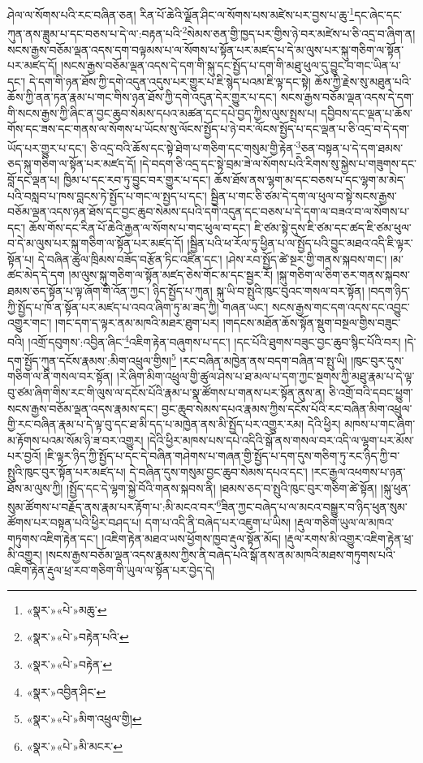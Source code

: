 ཤེལ་ལ་སོགས་པའི་རང་བཞིན་ཅན། རིན་པོ་ཆེའི་ལྗོན་ཤིང་ལ་སོགས་པས་མཛེས་པར་བྱས་པ་ཆུ་\footnote{«སྣར་»«པེ་»མཆུ་}དང་ཞེང་དང་ཀུན་ནས་ཟླུམ་པ་དང་བཅས་པ་དེ་ལ་:བརྟན་པའི་\footnote{«སྣར་»«པེ་»བརྟེན་པའི་}སེམས་ཅན་གྱི་ཁྱད་པར་གྱིས་ཉེ་བར་མཛེས་པ་ཅི་འདྲ་བ་ཞིག་ན། སངས་རྒྱས་བཅོམ་ལྡན་འདས་དག་བལྟམས་པ་ལ་སོགས་པ་སྟོན་པར་མཛད་པ་དེ་མ་ལུས་པར་སྐུ་གཅིག་ལ་སྟོན་པར་མཛད་དོ། །སངས་རྒྱས་བཅོམ་ལྡན་འདས་དེ་དག་གི་སྐུ་དང་སྤྱོད་པ་དག་གི་མཐུ་ཕུལ་དུ་བྱུང་བ་གང་ཡིན་པ་དང་། དེ་དག་གི་ཉན་ཐོས་ཀྱི་དགེ་འདུན་འདུས་པར་གྱུར་པ་ཇི་སྙེད་པའམ་ཇི་ལྟ་དང་སྟེ། ཆོས་ཀྱི་རྗེས་སུ་མཐུན་པའི་ཆོས་ཀྱི་ནན་ཏན་རྣམ་པ་གང་གིས་ཉན་ཐོས་ཀྱི་དགེ་འདུན་དེར་གྱུར་པ་དང་། སངས་རྒྱས་བཅོམ་ལྡན་འདས་དེ་དག་གི་སངས་རྒྱས་ཀྱི་ཞིང་ན་བྱང་ཆུབ་སེམས་དཔའ་མཚན་དང་དཔེ་བྱད་ཀྱིས་ལུས་སྤྲས་པ། དབྱིབས་དང་ལྡན་པ་ཆོས་གོས་དང་ཟས་དང་གནས་ལ་སོགས་པ་ཡོངས་སུ་ལོངས་སྤྱོད་པ་ཉེ་བར་ལོངས་སྤྱོད་པ་དང་ལྡན་པ་ཅི་འདྲ་བ་དེ་དག་ཡོད་པར་གྱུར་པ་དང་། ཅི་འདྲ་བའི་ཆོས་དང་སྟེ་ཐེག་པ་གཅིག་དང་གསུམ་གྱི་རྟེན་\footnote{«སྣར་»«པེ་»བརྟེན་}ཅན་བསྟན་པ་དེ་དག་ཐམས་ཅད་སྐུ་གཅིག་ལ་སྟོན་པར་མཛད་དོ། །དེ་བདག་ཅི་འདྲ་དང་སྟེ་བྲམ་ཟེ་ལ་སོགས་པའི་རིགས་སུ་སྐྱེས་པ་གཟུགས་དང་བློ་དང་ལྡན་པ། ཁྱིམ་པ་དང་རབ་ཏུ་བྱུང་བར་གྱུར་པ་དང་། ཆོས་ཐོས་ནས་ལྷག་མ་དང་བཅས་པ་དང་ལྷག་མ་མེད་པའི་བསླབ་པ་ཁས་བླངས་ཏེ་སྤྱོད་པ་གང་ལ་སྤྱད་པ་དང་། སྦྱིན་པ་གང་ཅི་ཙམ་དེ་དག་ལ་ཕུལ་བ་སྟེ་སངས་རྒྱས་བཅོམ་ལྡན་འདས་ཉན་ཐོས་དང་བྱང་ཆུབ་སེམས་དཔའི་དགེ་འདུན་དང་བཅས་པ་དེ་དག་ལ་བཟའ་བ་ལ་སོགས་པ་དང་། ཆོས་གོས་དང་རིན་པོ་ཆེའི་རྒྱན་ལ་སོགས་པ་གང་ཕུལ་བ་དང་། ཇི་ཙམ་སྟེ་དུས་ཇི་ཙམ་དང་ཚད་ཇི་ཙམ་ཕུལ་བ་དེ་མ་ལུས་པར་སྐུ་གཅིག་ལ་སྟོན་པར་མཛད་དོ། །སྦྱིན་པའི་ཕ་རོལ་ཏུ་ཕྱིན་པ་ལ་སྤྱོད་པའི་བྱུང་མཐའ་འདི་ཇི་ལྟར་སྟོན་པ། དེ་བཞིན་ཚུལ་ཁྲིམས་བཟོད་བརྩོན་ཏིང་འཛིན་དང་། །ཤེས་རབ་སྤྱོད་ཚེ་སྔར་གྱི་གནས་སྐབས་གང་། །མ་ཚང་མེད་དེ་དག །མ་ལུས་སྐུ་གཅིག་ལ་སྟོན་མཛད་ཅེས་གོང་མ་དང་སྦྱར་རོ། །སྐུ་གཅིག་ལ་ཅིག་ཅར་གནས་སྐབས་ཐམས་ཅད་སྟོན་པ་ལྟ་ཞོག་གི་འོན་ཀྱང་། ཉིད་སྤྱོད་པ་ཀུན། སྐུ་ཡི་བ་སྤུའི་ཁུང་བུའང་གསལ་བར་སྟོན། །བདག་ཉིད་ཀྱི་སྤྱོད་པ་ཁོ་ན་སྟོན་པར་མཛད་པ་འབའ་ཞིག་ཏུ་མ་ཟད་ཀྱི། གཞན་ཡང་། སངས་རྒྱས་གང་དག་འདས་དང་འབྱུང་འགྱུར་གང་། །གང་དག་ད་ལྟར་ནམ་མཁའི་མཐར་ཐུག་པར། །གདངས་མཐོན་ཆོས་སྟོན་སྡུག་བསྔལ་གྱིས་བཟུང་བའི། །འགྲོ་དབུགས་:འབྱིན་ཞིང་\footnote{«སྣར་»འབྱིན་ཤིང་}འཇིག་རྟེན་བཞུགས་པ་དང་། །དང་པོའི་ཐུགས་བཟུང་བྱང་ཆུབ་སྙིང་པོའི་བར། །དེ་དག་སྤྱོད་ཀུན་དངོས་རྣམས་:མིག་འཕྲུལ་གྱིས།\footnote{«སྣར་»«པེ་»མིག་འཕྲུལ་གྱི།} །རང་བཞིན་མཁྱེན་ནས་བདག་བཞིན་བ་སྤུ་ཡི། །ཁུང་བུར་དུས་གཅིག་ལ་ནི་གསལ་བར་སྟོན། །རེ་ཞིག་མིག་འཕྲུལ་གྱི་ཚུལ་ཤེས་པ་ཐ་མལ་པ་དག་ཀྱང་སྔགས་ཀྱི་མཐུ་རྣམ་པ་དེ་ལྟ་བུ་ཙམ་ཞིག་གིས་རང་གི་ལུས་ལ་དངོས་པོའི་རྣམ་པ་སྣ་ཚོགས་པ་གནས་པར་སྟོན་ནུས་ན། ཅི་འགྲོ་བའི་དབང་ཕྱུག་སངས་རྒྱས་བཅོམ་ལྡན་འདས་རྣམས་དང་། བྱང་ཆུབ་སེམས་དཔའ་རྣམས་ཀྱིས་དངོས་པོའི་རང་བཞིན་མིག་འཕྲུལ་གྱི་རང་བཞིན་རྣམ་པ་དེ་ལྟ་བུ་དང་ཐ་མི་དད་པ་མཁྱེན་ནས་མི་སྤྱོད་པར་འགྱུར་རམ། དེའི་ཕྱིར། མཁས་པ་གང་ཞིག་མ་རྟོགས་པའམ་སོམ་ཉི་ཟ་བར་འགྱུར། །དེའི་ཕྱིར་མཁས་པས་དཔེ་འདིའི་སྒོ་ནས་གསལ་བར་འདི་ལ་ལྷག་པར་མོས་པར་བྱའོ། །ཇི་ལྟར་ཉིད་ཀྱི་སྤྱོད་པ་དང་དེ་བཞིན་གཤེགས་པ་གཞན་གྱི་སྤྱོད་པ་དག་དུས་གཅིག་ཏུ་རང་ཉིད་ཀྱི་བ་སྤུའི་ཁུང་བུར་སྟོན་པར་མཛད་པ། དེ་བཞིན་དུས་གསུམ་བྱང་ཆུབ་སེམས་དཔའ་དང་། །རང་རྒྱལ་འཕགས་པ་ཉན་ཐོས་མ་ལུས་ཀྱི། །སྤྱོད་དང་དེ་ལྷག་སྐྱེ་བོའི་གནས་སྐབས་ནི། །ཐམས་ཅད་བ་སྤུའི་ཁུང་བུར་གཅིག་ཚེ་སྟོན། །སྐུ་ཕུན་སུམ་ཚོགས་པ་བརྗོད་ནས་རྣམ་པར་རྟོག་པ་:མི་མངའ་བར་\footnote{«སྣར་»«པེ་»མི་མངར་}ཟིན་ཀྱང་བཞེད་པ་ལ་མངའ་བསྒྱུར་བ་ཉིད་ཕུན་སུམ་ཚོགས་པར་བསྟན་པའི་ཕྱིར་བཤད་པ། དག་པ་འདི་ནི་བཞེད་པར་འཇུག་པ་ཡིས། །རྡུལ་གཅིག་ཡུལ་ལ་མཁའ་གཏུགས་འཇིག་རྟེན་དང་། །འཇིག་རྟེན་མཐའ་ཡས་ཕྱོགས་ཁྱབ་རྡུལ་སྟོན་མོད། །རྡུལ་རགས་མི་འགྱུར་འཇིག་རྟེན་ཕྲ་མི་འགྱུར། །སངས་རྒྱས་བཅོམ་ལྡན་འདས་རྣམས་ཀྱིས་ནི་བཞེད་པའི་སྒོ་ནས་ནམ་མཁའི་མཐས་གཏུགས་པའི་འཇིག་རྟེན་རྡུལ་ཕྲ་རབ་གཅིག་གི་ཡུལ་ལ་སྟོན་པར་བྱེད་དེ། 